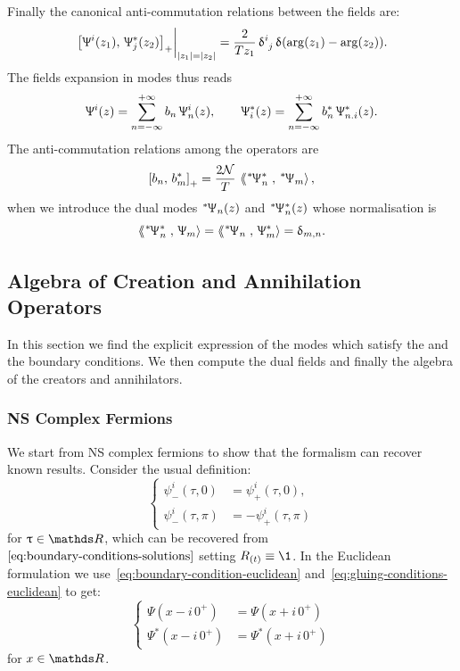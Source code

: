 Finally the canonical anti-commutation relations between the fields are:
\begin{equation}
  \eval{
    \qty[
      \Psi^i( z_1 ),\,
      \Psi_{j}^*( z_2 )
    ]_+
  }_{\abs{z_1} = \abs{z_2}}
  =
  \frac{2}{T z_1}\, \tensor{\delta}{^i_j}\, \delta( \arg(z_1) - \arg(z_2) ).
\end{equation}
The fields expansion in modes thus reads
\begin{equation}
  \Uppsi^i(z)
  =
  \sum\limits_{n = -\infty}^{+\infty} b_n\, \Uppsi^i_{n}(z),
  \qquad
  \Uppsi^*_{i}(z)
  =
  \sum\limits_{n = -\infty}^{+\infty} b^*_n\, \Uppsi^*_{n. i}(z).
  \label{eq:complex-plane-mode-expansion}
\end{equation}
The anti-commutation relations among the operators are
\begin{equation}
  \liebraket{b_n}{b^*_m}_+
  =
  \frac{2 \cN}{T}\, \lconsprod{\dual{\Psi}^*_{n}}{\dual{\Psi}_{m}},
\end{equation}
when we introduce the dual modes
$\dual{\Psi}_{n}(z)$ and $\dual{\Psi}^*_{n}(z)$ whose normalisation is
\begin{equation}
  \lconsprod{\dual{\Psi}^*_{n}}{{\Psi}_{m}}
  =
  \lconsprod{\dual{\Psi}_{n}}{{\Psi}^*_{m}}
  =
  \delta_{m,n}.
\end{equation}


\subsection{Algebra of Creation and Annihilation Operators}
\label{sec:modes_and_algebra}
  
In this section we find the explicit expression of the modes which satisfy the \eom and the boundary conditions.
We then compute the dual fields and finally the algebra of the creators and annihilators.


\subsubsection{NS Complex Fermions}
\label{sec:ns-complex-fermions}

We start from NS complex fermions to show that the formalism can recover known results.
Consider the usual definition:
\begin{equation}
  \begin{cases}
    \psi_-^i( \tau, 0 )
    & =
    \psi_+^i( \tau, 0 ),
    \\
    \psi_-^i( \tau, \pi )
    & =
    -\psi_+^i( \tau, \pi )
  \end{cases}
\end{equation}
for $\tau \in \R$, which can be recovered from~$\eqref{eq:boundary-conditions-solutions}$ setting $R_{(t)} \equiv \1$.
In the Euclidean formulation we use~\eqref{eq:boundary-condition-euclidean} and~\eqref{eq:gluing-conditions-euclidean} to get:
\begin{equation}
  \begin{cases}
    \Psi( x - i\, 0^+ ) & =  \Psi( x + i\, 0^+ )
    \\
    \Psi^*( x - i\, 0^+ ) & =  \Psi^*( x + i\, 0^+ )
  \end{cases}
\end{equation}
for $x \in \R$.

